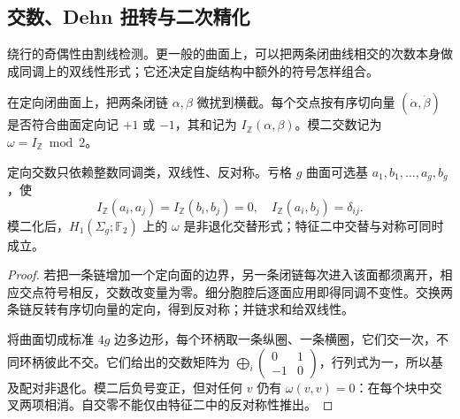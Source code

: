 \subsection{交数、Dehn 扭转与二次精化}

绕行的奇偶性由割线检测。更一般的曲面上，可以把两条闭曲线相交的次数本身做成同调上的双线性形式；它还决定自旋结构中额外的符号怎样组合。

\begin{definition}[定向交数与模二交数]
在定向闭曲面上，把两条闭链 $\alpha,\beta$ 微扰到横截。每个交点按有序切向量 $(\dot\alpha,\dot\beta)$ 是否符合曲面定向记 $+1$ 或 $-1$，其和记为 $I_{\mathbb Z}(\alpha,\beta)$。模二交数记为 $\omega=I_{\mathbb Z}\bmod2$。
\end{definition}
\begin{proposition}[交数在同调上良定义且非退化]
定向交数只依赖整数同调类，双线性、反对称。亏格 $g$ 曲面可选基 $a_1,b_1,\ldots,a_g,b_g$，使
\[
 I_{\mathbb Z}(a_i,a_j)=I_{\mathbb Z}(b_i,b_j)=0,
 \quad I_{\mathbb Z}(a_i,b_j)=\delta_{ij}.
\]
模二化后，$H_1(\Sigma_g;\mathbb F_2)$ 上的 $\omega$ 是非退化交替形式；特征二中交替与对称可同时成立。
\end{proposition}
\begin{proof}
若把一条链增加一个定向面的边界，另一条闭链每次进入该面都须离开，相应交点符号相反，交数改变量为零。细分胞腔后逐面应用即得同调不变性。交换两条链反转有序切向量的定向，得到反对称；并链求和给双线性。

将曲面切成标准 $4g$ 边多边形，每个环柄取一条纵圈、一条横圈，它们交一次，不同环柄彼此不交。它们给出的交数矩阵为 $\bigoplus_i\left(\begin{smallmatrix}0&1\\-1&0\end{smallmatrix}\right)$，行列式为一，所以基及配对非退化。模二后负号变正，但对任何 $v$ 仍有 $\omega(v,v)=0$：在每个块中交叉两项相消。自交零不能仅由特征二中的反对称性推出。
\end{proof}

